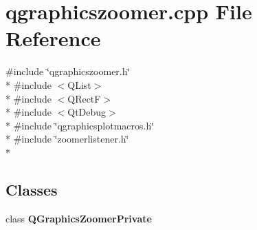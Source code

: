 \section{qgraphicszoomer.\+cpp File Reference}
\label{bk3_2qgraphicszoomer_8cpp}
{\ttfamily \#include \char`\"{}qgraphicszoomer.\+h\char`\"{}}\\*
{\ttfamily \#include $<$Q\+List$>$}\\*
{\ttfamily \#include $<$Q\+RectF$>$}\\*
{\ttfamily \#include $<$Qt\+Debug$>$}\\*
{\ttfamily \#include \char`\"{}qgraphicsplotmacros.\+h\char`\"{}}\\*
{\ttfamily \#include \char`\"{}zoomerlistener.\+h\char`\"{}}\\*
\subsection*{Classes}
\begin{DoxyCompactItemize}
\item 
class {\bf Q\+Graphics\+Zoomer\+Private}
\end{DoxyCompactItemize}
